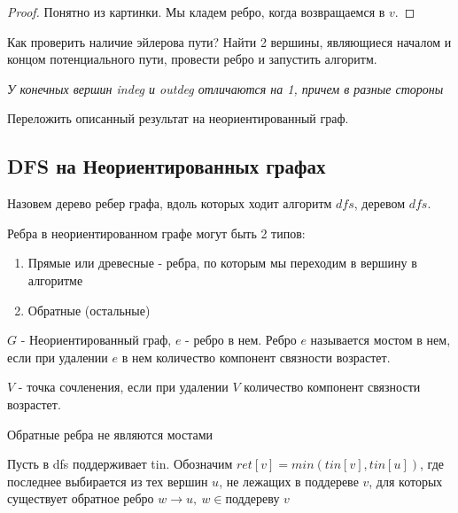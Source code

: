 \begin{proof}
  Понятно из картинки. Мы кладем ребро, когда возвращаемся в $v$.
\end{proof}

\begin{note}
Как проверить наличие эйлерова пути? Найти 2 вершины, являющиеся началом и концом потенциального пути, провести ребро и запустить алгоритм.

\textit{У конечных вершин indeg и outdeg отличаются на 1, причем в разные стороны}
\end{note}

\begin{proposition}
  Переложить описанный результат на неориентированный граф. 
\end{proposition}

\subsection{DFS на Неориентированных графах}

Назовем дерево ребер графа, вдоль которых ходит алгоритм $dfs$, деревом $dfs$. 

\begin{note}
  Ребра в неориентированном графе могут быть 2 типов:
  \begin{enumerate}
    \item Прямые или древесные - ребра, по которым мы переходим в вершину в алгоритме
    \item Обратные (остальные)
  \end{enumerate}
\end{note}

\begin{definition}
  $G$ - Неориентированный граф, $e$ - ребро в нем. Ребро $e$ называется мостом в нем, если при удалении $e$ в нем количество компонент связности возрастет. 
\end{definition}

\begin{definition}
  $V$ - точка сочленения, если при удалении $V$ количество компонент связности возрастет.
\end{definition}

\begin{proposition}
  Обратные ребра не являются мостами
\end{proposition}

Пусть в dfs поддерживает tin. Обозначим $ret[v] = min(tin[v], tin[u])$, где последнее выбирается из тех вершин $u$, не лежащих в поддереве $v$, для которых существует обратное ребро $w \to u, \ w \in \text{поддереву $v$}$


